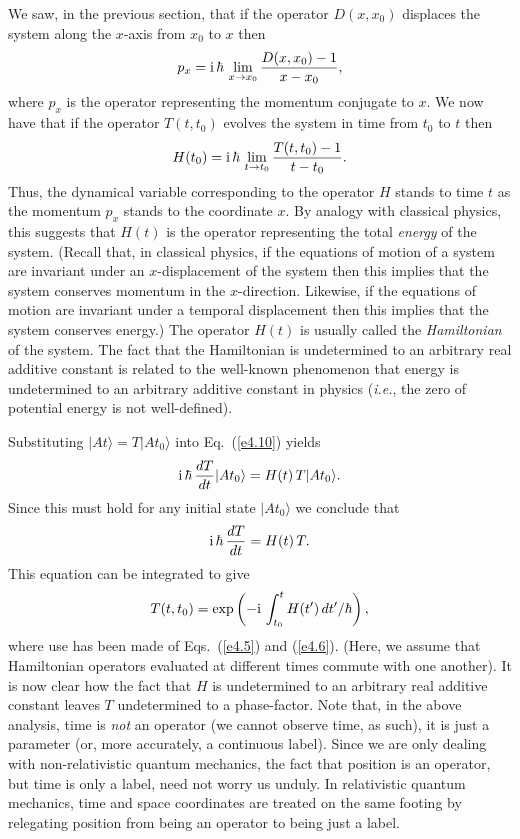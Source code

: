 We saw, in the previous section, that
if the operator $D(x, x_0)$ displaces the system along the $x$-axis from $x_0$ to $x$
then
\begin{equation}
p_x = {\rm i}\,\hbar\,\lim_{x\rightarrow x_0} \frac{D(x,x_0)-1}{x-x_0},
\end{equation}
where $p_x$ is the operator representing the momentum conjugate to $x$. We now
have that if the operator $T(t, t_0)$ evolves the system in time from $t_0$ to $t$
then
\begin{equation}
H(t_0) = {\rm i}\,\hbar\,\lim_{t\rightarrow t_0} \frac{T(t, t_0)-1}{t-t_0}.
\end{equation}
Thus, the 
dynamical variable corresponding to
the operator $H$ stands  to time $t$ as the momentum $p_x$ stands  to the
coordinate $x$. By analogy
with classical physics, this suggests that $H(t)$ is the operator representing
the total {\em energy} of the system. (Recall that, in classical physics,
if the equations of motion of a system are invariant under an $x$-displacement
of the system then this implies that the system conserves momentum in the
$x$-direction. Likewise, if the equations of motion are invariant under
a temporal displacement then this implies that the system conserves energy.)
The operator $H(t)$ is usually called the {\em Hamiltonian} of the system. 
The fact that the Hamiltonian is undetermined to an arbitrary real additive
constant is related to the well-known phenomenon that  energy is
undetermined to an arbitrary additive constant in physics ({\em i.e.}, the zero
of potential energy is not well-defined). 

Substituting $|At\rangle = T |At_0\rangle$ into Eq.~(\ref{e4.10}) yields
\begin{equation}
{\rm i}\,\hbar \,\frac{d T}{dt}|At_0\rangle = H(t)\,T|At_0\rangle.
\end{equation}
Since this must hold for any initial state $|At_0\rangle$ we conclude that
\begin{equation}\label{e4.14}
{\rm i} \,\hbar\, \frac{dT}{dt} = H(t) \,T.
\end{equation}
This  equation can be integrated to give
\begin{equation}\label{e4.15}
T(t, t_0) = \exp\left(-{\rm i} \,\int_{t_0}^t H(t') \,dt'/\hbar\right),
\end{equation}
where use has been made of Eqs.~(\ref{e4.5}) and (\ref{e4.6}). 
(Here, we assume that Hamiltonian operators
evaluated at  different times commute with one another). It is now clear  how
the fact that $H$ is undetermined to an arbitrary real additive constant leaves
$T$ undetermined to a phase-factor. Note that, in the above
analysis,  time is {\em not} an
operator (we cannot observe time, as such), it is just a parameter (or, more 
accurately, a continuous label). Since we are only dealing with non-relativistic
quantum mechanics, the fact that position is an operator, but time is only a
label, need not worry us unduly. In relativistic quantum mechanics, time and space
coordinates are treated on the same footing by relegating position from being
an operator to being just a label. 

